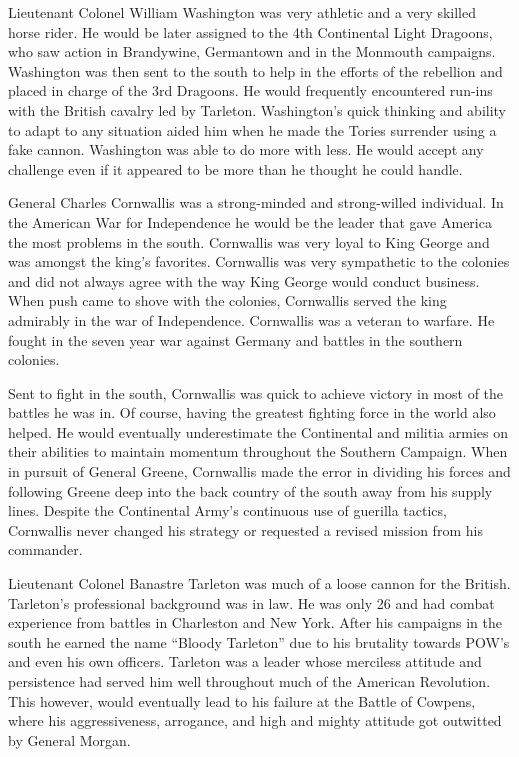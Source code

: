 Lieutenant Colonel William Washington was very athletic and a very skilled horse
rider. He would be later assigned to the 4th Continental Light Dragoons, who saw
action in Brandywine, Germantown and in the Monmouth campaigns. Washington was
then sent to the south to help in the efforts of the rebellion and placed in
charge of the 3rd Dragoons.  He would frequently encountered run-ins with the
British cavalry led by Tarleton.  Washington’s quick thinking and ability to
adapt to any situation aided him when he made the Tories surrender  using a fake
cannon. Washington was able to do more with less.  He would accept any challenge
even if it appeared to be more than he thought he could handle.

General Charles Cornwallis was a strong-minded and strong-willed individual.  In
the American War for Independence he would be the leader that gave America the
most problems in the south.  Cornwallis was very loyal to King George and was
amongst the king’s favorites.  Cornwallis was very sympathetic to the colonies
and did not always agree with the way King George would conduct business. When
push came to shove with the colonies, Cornwallis served the king admirably in
the war of Independence. Cornwallis was a veteran to warfare.  He fought in the
seven year war against Germany and battles in the southern colonies.

Sent to fight in the south, Cornwallis was quick to achieve victory in most of
the battles he was in.  Of course, having the greatest fighting force in the
world also helped.  He would eventually underestimate the Continental and
militia armies on their abilities to maintain momentum throughout the Southern
Campaign.  When in pursuit of General Greene, Cornwallis made the error in
dividing his forces and following Greene deep into the back country of the south
away from his supply lines. Despite the Continental Army’s continuous use of
guerilla tactics, Cornwallis never changed his strategy or requested a revised
mission from his commander. 

Lieutenant Colonel Banastre Tarleton was much of a loose cannon for the British.
Tarleton’s professional background was in law.  He was only 26 and had combat
experience from battles in Charleston and New York.  After his campaigns in the
south he earned the name “Bloody Tarleton” \cite[p.44]{babits_devil_2001} due to his brutality
towards POW’s and even his own officers.  Tarleton was a leader whose merciless
attitude and persistence had served him well throughout much of the American
Revolution.  This however, would eventually lead to his failure at the Battle of
Cowpens, where his aggressiveness, arrogance, and high and mighty attitude got
outwitted by General Morgan. 

